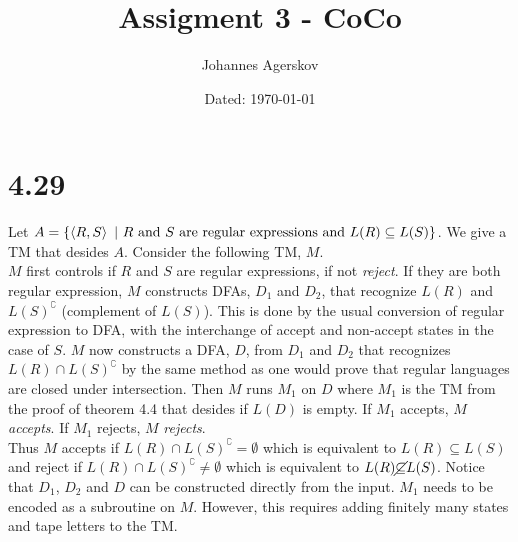 \documentclass[a4paper,11pt]{article}
\author{Johannes Agerskov}
\date{Dated: \today}
\title{Assigment 3 - CoCo}
\numberwithin{equation}{section}
\begin{document}
\maketitle	
\section*{4.29}
Let $ A=\{\braket{R,S}\ \vert\ R\text{ and }S\text{ are regular expressions and }L(R)\subseteq L(S)\} $. We give a TM that desides $ A $. Consider the following TM, $ M $.\\
$ M $ first controls if $ R $ and $ S $ are regular expressions, if not \emph{reject}. If they are both regular expression, $ M $ constructs DFAs, $ D_1 $ and $ D_2 $, that recognize $ L(R) $ and $ L(S)^\complement $ (complement of $ L(S) $). This is done by the usual conversion of regular expression to DFA, with the interchange of accept and non-accept states in the case of $ S $. $ M $ now constructs a DFA, $ D $, from $ D_1 $ and $ D_2 $ that recognizes $ L(R)\cap L(S)^\complement $ by the same method as one would prove that regular languages are closed under intersection. Then $ M $ runs $ M_1 $ on $ D $ where $ M_1 $ is the TM from the proof of theorem 4.4 that desides if $ L(D) $ is empty. If $ M_1 $ accepts, $ M $ \emph{accepts}. If $ M_1 $ rejects, $ M $ \emph{rejects}.\\
Thus $ M $ accepts if $ L(R)\cap L(S)^\complement=\emptyset $ which is equivalent to $ L(R)\subseteq L(S) $ and reject if $ L(R)\cap L(S)^\complement\neq\emptyset $ which is equivalent to $ L(R)\cancel{\subseteq}L(S) $.
Notice that $ D_1 $, $ D_2 $ and $ D $ can be constructed directly from the input. $ M_1 $ needs to be encoded as a subroutine on $ M $. However, this requires adding finitely many states and tape letters to the TM.
\end{document}
